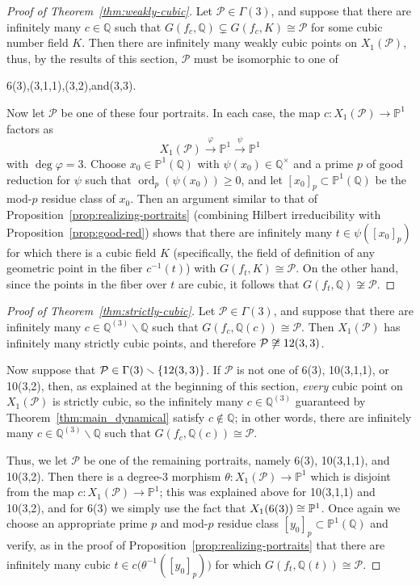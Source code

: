 \documentclass[12pt]{amsart}
\theoremstyle{definition}
\newcommand{\bbP}{\mathbb{P}}
\newcommand{\bbQ}{\mathbb{Q}}
\newcommand{\calP}{\mathcal{P}}
\newcommand{\ord}{\operatorname{ord}}
\newcommand{\longto}{\longrightarrow}
\numberwithin{equation}{section}
\begin{document}
\begin{proof}[Proof of Theorem~\ref{thm:weakly-cubic}]
Let $\calP \in \Gamma(3)$, and suppose that there are infinitely many $c \in \bbQ$ such that $G(f_c,\bbQ) \subsetneq G(f_c,K) \cong \calP$ for some cubic number field $K$. Then there are infinitely many weakly cubic points on $X_1(\calP)$, thus, by the results of this section, $\calP$ must be isomorphic to one of
        \begin{center}
        \rm
        6(3),(3,1,1),(3,2),\quad and(3,3).
        \end{center}
Now let $\calP$ be one of these four portraits. In each case, the map $c : X_1(\calP)\to\bbP^1$ factors as
    \[
    X_1(\calP) \overset{\varphi}{\longto} \bbP^1 \overset{\psi}{\longto} \bbP^1
    \]
with $\deg\varphi = 3$. Choose $x_0 \in \bbP^1(\bbQ)$ with $\psi(x_0) \in \bbQ^\times$ and a prime $p$ of good reduction for $\psi$ such that $\ord_p(\psi(x_0)) \ge 0$, and let $[x_0]_p \subset \bbP^1(\bbQ)$ be the mod-$p$ residue class of $x_0$. Then an argument similar to that of Proposition~\ref{prop:realizing-portraits} (combining Hilbert irreducibility with Proposition~\ref{prop:good-red}) shows that there are infinitely many $t \in \psi([x_0]_p)$ for which there is a cubic field $K$ (specifically, the field of definition of any geometric point in the fiber $c^{-1}(t)$) with $G(f_t,K) \cong \calP$. On the other hand, since the points in the fiber over $t$ are cubic, it follows that $G(f_t,\bbQ) \not\cong \calP$.
\end{proof}

\begin{proof}[Proof of Theorem~\ref{thm:strictly-cubic}]
Let $\calP \in \Gamma(3)$, and suppose that there are infinitely many $c \in \bbQ^{(3)} \smallsetminus \bbQ$ such that $G(f_c,\bbQ(c)) \cong \calP$. Then $X_1(\calP)$ has infinitely many strictly cubic points, and therefore $\calP \not\cong \rm 12(3,3)$.

Now suppose that $\calP \in \Gamma(3)\smallsetminus\{\rm12(3,3)\}$. If $\calP$ is not one of 6(3), 10(3,1,1), or 10(3,2), then, as explained at the beginning of this section, {\it every} cubic point on $X_1(\calP)$ is strictly cubic, so the infinitely many $c\in \bbQ^{(3)}$ guaranteed by Theorem~\ref{thm:main_dynamical} satisfy $c\notin \bbQ$; in other words, there are infinitely many $c \in \bbQ^{(3)}\smallsetminus \bbQ$ such that $G(f_c,\bbQ(c)) \cong \calP$. 

Thus, we let $\calP$ be one of the remaining portraits, namely 6(3), 10(3,1,1), and 10(3,2). Then there is a degree-$3$ morphism $\theta:X_1(\calP)\to\bbP^1$ which is disjoint from the map $c : X_1(\calP)\to\bbP^1$; this was explained above for 10(3,1,1) and 10(3,2), and for 6(3) we simply use the fact that $X_1(\rm6(3)) \cong \bbP^1$. Once again we choose an appropriate prime $p$ and mod-$p$ residue class $[y_0]_p\subset\bbP^1(\bbQ)$ and verify, as in the proof of Proposition~\ref{prop:realizing-portraits} that there are infinitely many cubic $t \in c\big(\theta^{-1}([y_0]_p)\big)$ for which $G(f_t,\bbQ(t)) \cong \calP$.
\end{proof}
\end{document}
